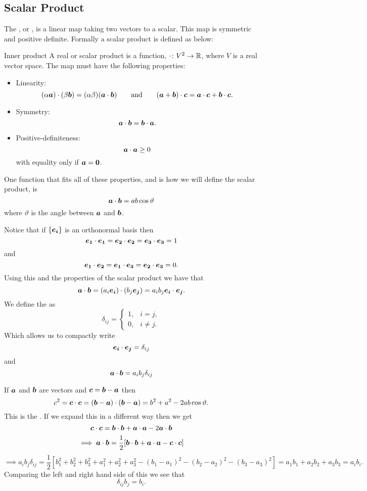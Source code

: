 \documentclass[a4paper]{article}
\begin{document}
    \subsection{Scalar Product}
    The , or , is a linear map taking two vectors to a scalar.
    This map is symmetric and positive definite.
    Formally a scalar product is defined as below:
    \begin{definition}{Inner product}{}
       A real  or scalar product is a function, \(\cdot\colon V^2 \to \mathbb{R}\), where \(V\) is a real vector space.
       The map must have the following properties:
       \begin{itemize}
           \item Linearity:
           \[(\alpha\bm{a})\cdot(\beta\bm{b}) = (\alpha\beta)(\bm{a}\cdot\bm{b})\qquad\text{and}\qquad (\bm{a} + \bm{b})\cdot\bm{c} = \bm{a}\cdot\bm{c} + \bm{b}\cdot\bm{c}.\]
           \item Symmetry:
           \[\bm{a}\cdot\bm{b} = \bm{b}\cdot\bm{a}.\]
           \item Positive-definiteness:
           \[\bm{a}\cdot\bm{a} \ge 0\]
           with equality only if \(\bm{a} = \bm{0}\).
       \end{itemize}
        One function that fits all of these properties, and is how we will define the scalar product, is
        \[\bm{a}\cdot\bm{b} = ab\cos\vartheta\]
        where \(\vartheta\) is the angle between \(\bm{a}\) and \(\bm{b}\).
    \end{definition}
    Notice that if \(\{\bm{e_{i}}\}\) is an orthonormal basis then
    \[\bm{e_{1}}\cdot\bm{e_{1}} = \bm{e_{2}}\cdot\bm{e_{2}} = \bm{e_{3}}\cdot\bm{e_{3}} = 1\]
    and 
    \[\bm{e_{1}}\cdot\bm{e_{2}} = \bm{e_{1}}\cdot\bm{e_{3}} = \bm{e_{2}}\cdot\bm{e_{3}} = 0.\]
    Using this and the properties of the scalar product we have that
    \[\bm{a}\cdot\bm{b} = (a_i\bm{e_{i}})\cdot(b_j\bm{e_{j}}) = a_ib_j\bm{e_{i}}\cdot\bm{e_{j}}.\]
    We define the  as
    \[
    \delta_{ij} = 
    \begin{cases}
        1, & i = j,\\
        0, & i \ne j.
    \end{cases}
    \]
    Which allows us to compactly write
    \[\bm{e_{i}}\cdot\bm{e_{j}} = \delta_{ij}\]
    and
    \[\bm{a}\cdot\bm{b} = a_ib_j\delta_{ij}\]
    
    If \(\bm{a}\) and \(\bm{b}\) are vectors and \(\bm{c} = \bm{b} - \bm{a}\) then
    \[c^2 = \bm{c}\cdot\bm{c} = (\bm{b} - \bm{a})\cdot(\bm{b} - \bm{a}) = b^2 + a^2 - 2ab\cos\vartheta.\]
    This is the .
    If we expand this in a different way then we get
    \[\bm{c}\cdot\bm{c} = \bm{b}\cdot\bm{b} + \bm{a}\cdot\bm{a} - 2\bm{a}\cdot\bm{b}\]
    \[\implies \bm{a}\cdot\bm{b} = \frac{1}{2}[\bm{b}\cdot\bm{b} + \bm{a}\cdot\bm{a} - \bm{c}\cdot\bm{c}]\]
    \[\implies a_ib_j\delta_{ij} = \frac{1}{2}[b_1^2 + b_2^2 + b_3^2 + a_1^2 + a_2^2 + a_3^2 - (b_1 - a_1)^2 - (b_2 - a_2)^2 - (b_3 - a_3)^2] = a_1b_1 + a_2b_2 + a_3b_3 = a_ib_i.\]
    Comparing the left and right hand side of this we see that
    \[\delta_{ij}b_j = b_i.\] 
    
\end{document}
